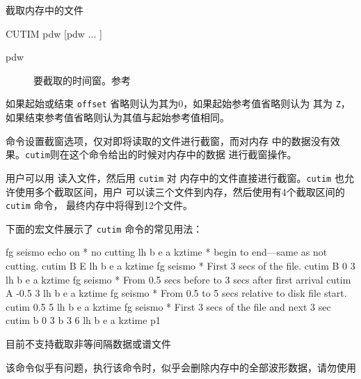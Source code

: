 \label{cmd:cutim}

截取内存中的文件

\begin{SACSTX}
CUTIM pdw [pdw ... ]
\end{SACSTX}

\begin{description}
\item [pdw] 要截取的时间窗。参考 
\end{description}

如果起始或结束 \texttt{offset} 省略则认为其为0，如果起始参考值省略则认为
其为 \texttt{Z}，如果结束参考值省略则认为其值与起始参考值相同。

 命令设置截窗选项，仅对即将读取的文件进行截窗，而对内存
中的数据没有效果。\texttt{cutim}则在这个命令给出的时候对内存中的数据
进行截窗操作。

用户可以用  读入文件，然后用 \texttt{cutim} 对
内存中的文件直接进行截窗。\texttt{cutim} 也允许使用多个截取区间，用户
可以读三个文件到内存，然后使用有4个截取区间的 \texttt{cutim} 命令，
最终内存中将得到12个文件。

下面的宏文件展示了 \texttt{cutim} 命令的常见用法：
\begin{SACCode}
fg seismo
echo on
* no cutting
lh b e a kztime
* begin to end---same as not cutting.
cutim B E
lh b e a kztime
fg seismo
* First 3 secs of the file.
cutim B 0 3
lh b e a kztime
fg seismo
* From 0.5 secs before to 3 secs after first arrival
cutim A -0.5 3
lh b e a kztime
fg seismo
* From 0.5 to 5 secs relative to disk file start.
cutim 0.5 5
lh b e a kztime
fg seismo
* First 3 secs of the file and next 3 sec
cutim b 0 3 b 3 6
lh b e a kztime
p1
\end{SACCode}

目前不支持截取非等间隔数据或谱文件

该命令似乎有问题，执行该命令时，似乎会删除内存中的全部波形数据，请勿使用
